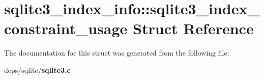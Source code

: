 \section{sqlite3\_\-index\_\-info::sqlite3\_\-index\_\-constraint\_\-usage Struct Reference}
\label{structsqlite3__index__info_1_1sqlite3__index__constraint__usage}


The documentation for this struct was generated from the following file:\begin{CompactItemize}
\item 
deps/sqlite/\bf{sqlite3.c}\end{CompactItemize}

